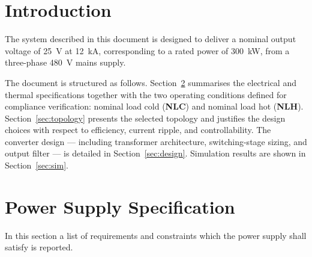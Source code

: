 \documentclass[11pt,a4paper]{scrartcl}
\begin{document}
\begin{onehalfspace}
\section{Introduction}

The system described in this document is designed to deliver a nominal output voltage of \SI{25}{\volt} at \SI{12}{\kilo\ampere},
corresponding to a rated power of \SI{300}{\kilo\watt}, from a three-phase \SI{480}{\volt} mains supply.

The document is structured as follows. Section~\ref{sec:specs} summarises the electrical
and thermal specifications together with the two operating conditions defined for
compliance verification: nominal load cold (\textbf{NLC}) and nominal load hot (\textbf{NLH}).
Section~\ref{sec:topology} presents the selected topology and justifies the design choices
with respect to efficiency, current ripple, and controllability.
The converter design — including transformer architecture, switching-stage sizing, and
output filter — is detailed in Section~\ref{sec:design}. Simulation results are shown in Section~\ref{sec:sim}.

\section{Power Supply Specification}\label{sec:specs}
In this section a list of requirements and constraints which the power supply shall satisfy is reported. 


\end{onehalfspace}
\end{document}
